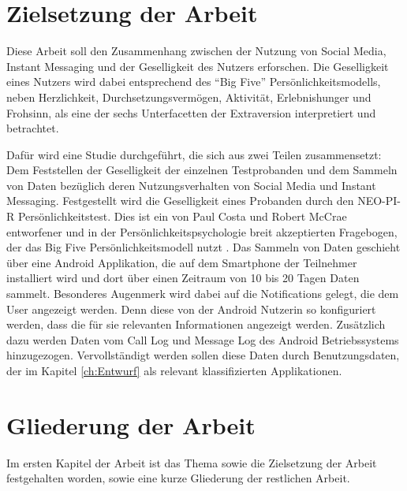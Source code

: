 \section{Zielsetzung der Arbeit}
\label{ch:Einleitung:sec:Zielsetzung}

Diese Arbeit soll den Zusammenhang zwischen der Nutzung von Social Media, Instant Messaging und der Geselligkeit des Nutzers erforschen.
Die Geselligkeit eines Nutzers wird dabei entsprechend des "`Big Five"' Persönlichkeitsmodells, neben Herzlichkeit, Durchsetzungsvermögen, Aktivität, Erlebnishunger und Frohsinn, als eine der sechs Unterfacetten der Extraversion interpretiert und betrachtet\cite{john1999big}.


Dafür wird eine Studie durchgeführt, die sich aus zwei Teilen zusammensetzt:
Dem Feststellen der Geselligkeit der einzelnen Testprobanden und dem Sammeln von Daten bezüglich deren Nutzungsverhalten von Social Media und Instant Messaging. 
Festgestellt wird die Geselligkeit eines Probanden durch den NEO-PI-R Persönlichkeitstest.
Dies ist ein von Paul Costa und Robert McCrae entworfener und in der Persönlichkeitspsychologie breit akzeptierten Fragebogen, der das Big Five Persönlichkeitsmodell nutzt \cite{costa1992neo}.
Das Sammeln von Daten geschieht über eine Android Applikation, die auf dem Smartphone der Teilnehmer installiert wird und dort über einen Zeitraum von 10 bis 20 Tagen Daten sammelt.
Besonderes Augenmerk wird dabei auf die Notifications gelegt, die dem User angezeigt werden.
Denn diese von der Android Nutzerin so konfiguriert werden, dass die für sie relevanten Informationen angezeigt werden.
Zusätzlich dazu werden Daten vom Call Log und Message Log des Android Betriebssystems hinzugezogen.
Vervollständigt werden sollen diese Daten durch Benutzungsdaten, der im Kapitel \ref{ch:Entwurf} als relevant klassifizierten Applikationen.


\section{Gliederung der Arbeit}
\label{ch:Einleitung:sec:Gliederung}

Im ersten Kapitel der Arbeit ist das Thema sowie die Zielsetzung der Arbeit festgehalten worden, sowie eine kurze Gliederung der restlichen Arbeit.
\par

